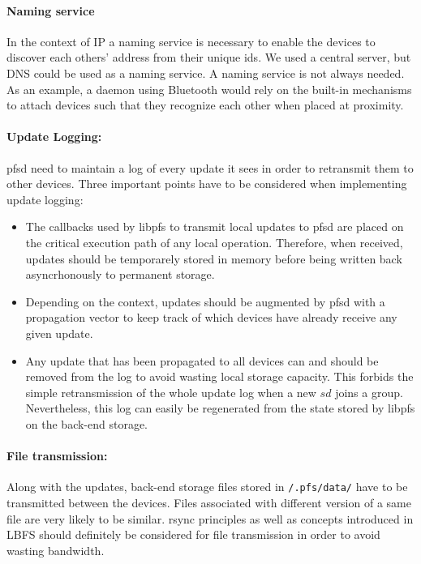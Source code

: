 \paragraph {Naming service}
In the context of IP a naming service is necessary to enable the
devices to discover each others' address from their unique ids. We
used a central server, but DNS could be used as a naming service. A
naming service is not always needed. As an example, a daemon using
Bluetooth would rely on the built-in mechanisms to attach devices such
that they recognize each other when placed at proximity.

\paragraph {Update Logging:}
pfsd need to maintain a log of every update it sees in order to
retransmit them to other devices. Three important points have to be
considered when implementing update logging:
\begin{itemize}
\item The callbacks used by libpfs to transmit local updates to pfsd are
  placed on the critical execution path of any local
  operation. Therefore, when received, updates should be temporarely
  stored in memory before being written back asyncrhonously to permanent
  storage.
\item Depending on the context, updates should be augmented by pfsd
  with a propagation vector to keep track of which devices have
  already receive any given update.
\item Any update that has been propagated to all devices can and
  should be removed from the log to avoid wasting local storage
  capacity. This forbids the simple retransmission of the whole update
  log when a new $sd$ joins a group. Nevertheless, this log can easily
  be regenerated from the state stored by libpfs on the back-end storage.
\end{itemize}

\paragraph {File transmission:}
Along with the updates, back-end storage files stored in {\tt /.pfs/data/}
have to be transmitted between the devices. Files associated with
different version of a same file are very likely to be
similar. rsync\cite{tridgell:rsync} principles as well as concepts
introduced in LBFS\cite{muthitacharoen:lbfs} should definitely be
considered for file transmission in order to avoid wasting bandwidth.


